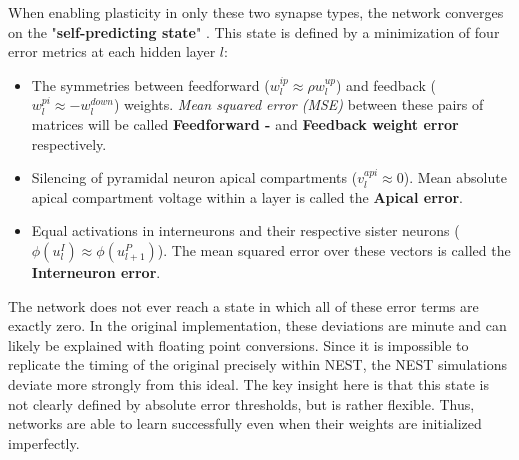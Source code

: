 When enabling plasticity in only these two synapse types, the network converges on the "\textbf{self-predicting state}"
\citep{sacramento2018dendritic}. This state is defined by a minimization of four error metrics at each hidden layer $l$:

\begin{itemize}
  \item The symmetries between feedforward ($w_l^{ip} \approx \rho w_l^{up}$) and feedback ($w_l^{pi} \approx
          -w_l^{down}$) weights. \textit{Mean squared error (MSE)} between these pairs of matrices will be called
        \textbf{Feedforward - } and \textbf{Feedback weight error} respectively.
  \item Silencing of pyramidal neuron apical compartments ($v_l^{api} \approx 0$). Mean absolute apical compartment
        voltage within a layer is called the \textbf{Apical error}.
  \item Equal activations in interneurons and their respective sister neurons ($\phi (u_l^I) \approx \phi (u_{l+1}^P)$).
        The mean squared error over these vectors is called the \textbf{Interneuron error}.
\end{itemize}

The network does not ever reach a state in which all of these error terms are exactly zero. In the original
implementation, these deviations are minute and can likely be explained with floating point conversions. Since it is
impossible to replicate the timing of the original precisely within NEST, the NEST simulations deviate more strongly
from this ideal. The key insight here is that this state is not clearly defined by absolute error thresholds, but is
rather flexible. Thus, networks are able to learn successfully even when their weights are initialized imperfectly.


